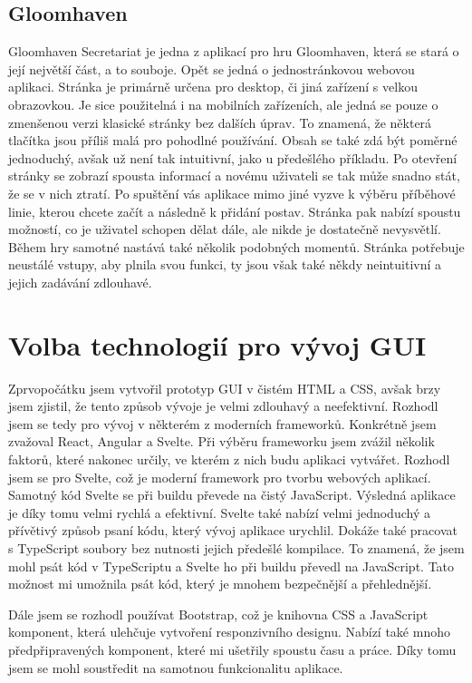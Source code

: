 \subsection{Gloomhaven}
Gloomhaven Secretariat je jedna z aplikací pro hru Gloomhaven, která se stará o její největší část, a to souboje. Opět se jedná o jednostránkovou webovou aplikaci. Stránka je primárně určena pro desktop, či jiná zařízení s velkou obrazovkou. Je sice použitelná i na mobilních zařízeních, ale jedná se pouze o zmenšenou verzi klasické stránky bez dalších úprav. To znamená, že některá tlačítka jsou příliš malá pro pohodlné používání. Obsah se také zdá být poměrné jednoduchý, avšak už není tak intuitivní, jako u předešlého příkladu. Po otevření stránky se zobrazí spousta informací a novému uživateli se tak může snadno stát, že se v nich ztratí. Po spuštění vás aplikace mimo jiné vyzve k výběru příběhové linie, kterou chcete začít a následně k přidání postav. Stránka pak nabízí spoustu možností, co je uživatel schopen dělat dále, ale nikde je dostatečně nevysvětlí. Během hry samotné nastává také několik podobných momentů. Stránka potřebuje neustálé vstupy, aby plnila svou funkci, ty jsou však také někdy neintuitivní a jejich zadávání zdlouhavé.

\section{Volba technologií pro vývoj GUI}
Zprvopočátku jsem vytvořil prototyp GUI v čistém HTML a CSS, avšak brzy jsem zjistil, že tento způsob vývoje je velmi zdlouhavý a neefektivní. Rozhodl jsem se tedy pro vývoj v některém z moderních frameworků. Konkrétně jsem zvažoval React, Angular a Svelte. Při výběru frameworku jsem zvážil několik faktorů, které nakonec určily, ve kterém z nich budu aplikaci vytvářet. Rozhodl jsem se pro Svelte, což je moderní framework pro tvorbu webových aplikací. Samotný kód Svelte se při buildu převede na čistý JavaScript. Výsledná aplikace je díky tomu velmi rychlá a efektivní. Svelte také nabízí velmi jednoduchý a přívětivý způsob psaní kódu, který vývoj aplikace urychlil. Dokáže také pracovat s TypeScript soubory bez nutnosti jejich předešlé kompilace. To znamená, že jsem mohl psát kód v TypeScriptu a Svelte ho při buildu převedl na JavaScript. Tato možnost mi umožnila psát kód, který je mnohem bezpečnější a přehlednější.

Dále jsem se rozhodl používat Bootstrap, což je knihovna CSS a JavaScript komponent, která ulehčuje vytvoření responzivního designu. Nabízí také mnoho předpřipravených komponent, které mi ušetřily spoustu času a práce. Díky tomu jsem se mohl soustředit na samotnou funkcionalitu aplikace.
